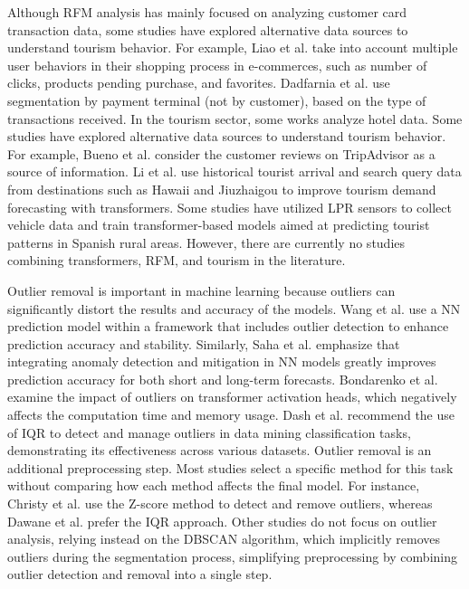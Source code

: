 \documentclass{ws-ijitdm}
\begin{document}
Although RFM analysis has mainly focused on analyzing customer card transaction data, some studies have explored alternative data sources to understand tourism behavior. For example, Liao et al.\cite{7} take into account multiple user behaviors in their shopping process in e-commerces, such as number of clicks, products pending purchase, and favorites. Dadfarnia et al.\cite{8} use segmentation by payment terminal (not by customer), based on the type of transactions received. In the tourism sector, some works analyze hotel data\cite{9,10}. Some studies have explored alternative data sources to understand tourism behavior. For example, Bueno et al.\cite{13,30} consider the customer reviews on TripAdvisor as a source of information. {\color{black}Li et al. \cite{li2024transformer} use historical tourist arrival and search query data from destinations such as Hawaii and Jiuzhaigou to improve tourism demand forecasting with transformers. Some studies have utilized LPR sensors to collect vehicle data and train transformer-based models aimed at predicting tourist patterns in Spanish rural areas\cite{rural1,tourism2}. However, there are currently no studies combining transformers, RFM, and tourism in the literature.}


Outlier removal is important in machine learning because outliers can significantly distort the results and accuracy of the models. Wang et al.\cite{15} use a NN prediction model within a framework that includes outlier detection to enhance prediction accuracy and stability. Similarly, Saha et al.\cite{16} emphasize that integrating anomaly detection and mitigation in NN models greatly improves prediction accuracy for both short and long-term forecasts. Bondarenko et al.\cite{17} examine the impact of outliers on transformer activation heads, which negatively affects the computation time and memory usage. Dash et al.\cite{31} recommend the use of IQR to detect and manage outliers in data mining classification tasks, demonstrating its effectiveness across various datasets. Outlier removal is an additional preprocessing step. Most studies select a specific method for this task without comparing how each method affects the final model. For instance, Christy et al.\cite{19} use the Z-score method to detect and remove outliers, whereas Dawane et al.\cite{20} prefer the IQR approach. Other studies\cite{21,22} do not focus on outlier analysis, relying instead on the DBSCAN algorithm, which implicitly removes outliers during the segmentation process, simplifying preprocessing by combining outlier detection and removal into a single step.
\end{document}
